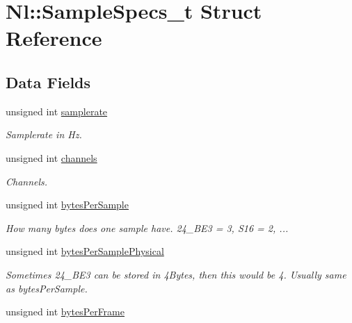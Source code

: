 \hypertarget{structNl_1_1SampleSpecs__t}{}\section{Nl\+:\+:Sample\+Specs\+\_\+t Struct Reference}
\label{structNl_1_1SampleSpecs__t}
\subsection*{Data Fields}
\begin{DoxyCompactItemize}
\item 
\hypertarget{structNl_1_1SampleSpecs__t_a0246e22ddbf483af484b73d5e56b5a91}{}unsigned int \hyperlink{structNl_1_1SampleSpecs__t_a0246e22ddbf483af484b73d5e56b5a91}{samplerate}\label{structNl_1_1SampleSpecs__t_a0246e22ddbf483af484b73d5e56b5a91}

\begin{DoxyCompactList}\small\item\em Samplerate in Hz. \end{DoxyCompactList}\item 
\hypertarget{structNl_1_1SampleSpecs__t_a0d5fcdbf8de5350ba5288b6c8003c15b}{}unsigned int \hyperlink{structNl_1_1SampleSpecs__t_a0d5fcdbf8de5350ba5288b6c8003c15b}{channels}\label{structNl_1_1SampleSpecs__t_a0d5fcdbf8de5350ba5288b6c8003c15b}

\begin{DoxyCompactList}\small\item\em Channels. \end{DoxyCompactList}\item 
\hypertarget{structNl_1_1SampleSpecs__t_aa587aa10501e3b8242e63f16d71eed88}{}unsigned int \hyperlink{structNl_1_1SampleSpecs__t_aa587aa10501e3b8242e63f16d71eed88}{bytes\+Per\+Sample}\label{structNl_1_1SampleSpecs__t_aa587aa10501e3b8242e63f16d71eed88}

\begin{DoxyCompactList}\small\item\em How many bytes does one sample have. 24\+\_\+\+B\+E3 = 3, S16 = 2, ... \end{DoxyCompactList}\item 
\hypertarget{structNl_1_1SampleSpecs__t_a3a56bec7d34d30f77c35a137d958bd21}{}unsigned int \hyperlink{structNl_1_1SampleSpecs__t_a3a56bec7d34d30f77c35a137d958bd21}{bytes\+Per\+Sample\+Physical}\label{structNl_1_1SampleSpecs__t_a3a56bec7d34d30f77c35a137d958bd21}

\begin{DoxyCompactList}\small\item\em Sometimes 24\+\_\+\+B\+E3 can be stored in 4\+Bytes, then this would be 4. Usually same as bytes\+Per\+Sample. \end{DoxyCompactList}\item 
\hypertarget{structNl_1_1SampleSpecs__t_a614ed7945d88426f82e2262f9e7681d3}{}unsigned int \hyperlink{structNl_1_1SampleSpecs__t_a614ed7945d88426f82e2262f9e7681d3}{bytes\+Per\+Frame}\label{structNl_1_1SampleSpecs__t_a614ed7945d88426f82e2262f9e7681d3}


\end{DoxyCompactItemize}
